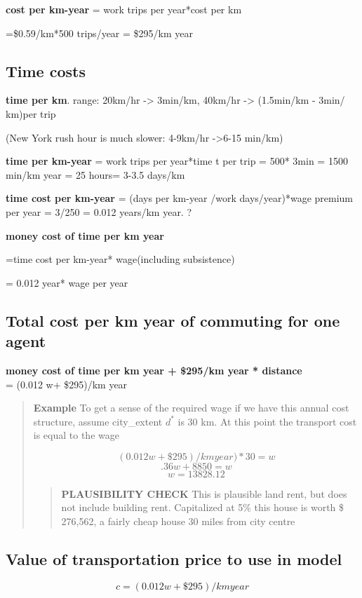 \textbf{cost per km-year} = work trips per year*cost per km

=\$0.59/km*500 trips/year  =  \$295/km year 



\subsection{Time costs}
\textbf{time per km}. range: 20km/hr -> 3min/km, 40km/hr -> (1.5min/km - 3min/ km)per trip 

(New York rush hour is much slower:  4-9km/hr ->6-15 min/km)

\textbf{time  per km-year} = work trips per year*time t per trip = 500* 3min  = 1500 min/km year = 25 hours= 3-3.5 days/km
 
\textbf{time cost per km-year} =  (days per km-year /work days/year)*wage premium per year  = 3/250 = 0.012 years/km year. ?

\textbf{money cost of time per km year} 

=time cost per km-year* wage(including subsistence) 

= 0.012 year* wage per year

\subsection{Total cost per km year of commuting for one agent}
\textbf{money cost of time per km year + \$295/km year * distance} \\
= (0.012 w+ \$295)/km year 
    \begin{quotation}
    \textbf{Example}
    To get a sense of the required wage if we have this annual cost structure, assume city\_extent $d^*$ is 30 km. At this point the transport cost is equal to the wage

\[(0.012 w+ \$295)/km year)*30 =  w\] 
\[.36w+ 8850=w\]
\[w=13828.12\]
        \begin{quotation}
        \textbf{PLAUSIBILITY CHECK}
This is plausible land rent, but does not include building rent. 
Capitalized at 5\% this house is worth \$ 276,562, a fairly cheap house 30 miles from city centre
        \end{quotation}
    \end{quotation}



\subsection{Value of transportation price to use in model}
\[ {c}=(0.012 w+ \$295)/km year \]

